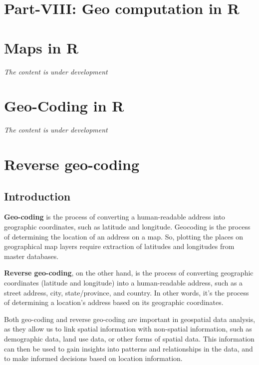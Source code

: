 \documentclass[
]{book}
\begin{document}
\hypertarget{part-viii-geo-computation-in-r}{%
\chapter*{Part-VIII: Geo computation in R}\label{part-viii-geo-computation-in-r}}

\hypertarget{maps-in-r}{%
\chapter{Maps in R}\label{maps-in-r}}

\emph{The content is under development}

\hypertarget{geo-coding-in-r}{%
\chapter{Geo-Coding in R}\label{geo-coding-in-r}}

\emph{The content is under development}

\hypertarget{reverse-geo-coding}{%
\chapter{Reverse geo-coding}\label{reverse-geo-coding}}

\hypertarget{introduction}{%
\section{Introduction}\label{introduction}}

\textbf{Geo-coding} is the process of converting a human-readable address into geographic coordinates, such as latitude and longitude. Geocoding is the process of determining the location of an address on a map. So, plotting the places on geographical map layers require extraction of latitudes and longitudes from master databases.

\textbf{Reverse geo-coding}, on the other hand, is the process of converting geographic coordinates (latitude and longitude) into a human-readable address, such as a street address, city, state/province, and country. In other words, it's the process of determining a location's address based on its geographic coordinates.

Both geo-coding and reverse geo-coding are important in geospatial data analysis, as they allow us to link spatial information with non-spatial information, such as demographic data, land use data, or other forms of spatial data. This information can then be used to gain insights into patterns and relationships in the data, and to make informed decisions based on location information.
\end{document}
